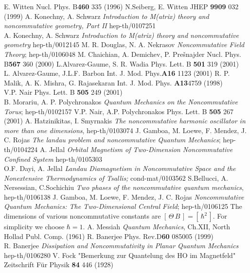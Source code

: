 \documentclass[a4paper,aps,prd,preprint]{revtex4}
\begin{document}
   
\begin{thebibliography}{99}
  E. Witten
Nucl. Phys. B\textbf{460} 335  (1996) 
 N.Seiberg,  E. Witten
JHEP \textbf{9909}  032 (1999)
 A. Konechny, A. Schwarz
 {\it  Introduction to M(atrix) theory and noncommutative geometry, Part II}
  hep-th/0107251\\
 A. Konechny, A. Schwarz
 {\it  Introduction to M(atrix) theory and noncommutative geometry}
  hep-th/0012145
M. R. Douglas, N. A. Nekrasov
 {\it Noncommutative Field Theory};  hep-th/0106048
 M. Chaichian, A. Demichev, P. Pre\v snajder
Nucl. Phys. B\textbf{567 } 360   (2000)
L.Alvarez-Gaume, S. R. Wadia
 Phys. Lett. B \textbf{501} 319 (2001)\\
 L. Alvarez-Gaume, J.L.F. Barbon 
 Int. J. Mod. Phys.\textbf{A16} 1123  (2001) 
  R. P. Malik, A. K. Mishra, G. Rajasekaran
   Int. J. Mod. Phys. \textbf{A13}4759 (1998)\\
  V.P. Nair 
  Phys. Lett. B \textbf{505} 249 (2001) \\
   B. Morariu, A. P. Polychronakos
  {\it Quantum Mechanics on the Noncommutative Torus}; hep-th/0102157
  V.P. Nair, A.P. Polychronakos 
Phys. Lett. B \textbf{505}  267 (2001)
  A. Hatzinikitas, I. Smyrnakis {\it  The noncommutative
 harmonic
oscillator in more than one dimensions}, hep-th/0103074
 J. Gamboa, M. Loewe, F. Mendez, J. C. Rojas
 {\it The landau problem and noncommutative Quantum Mechanics};
 hep-th/0104224
 A. Jellal
{\it Orbital Magnetism of Two-Dimension Noncommutative Confined System}
hep-th/0105303\\
O.F. Dayi, A. Jellal
 {\it Landau Diamagnetism in Noncommutative Space and the Nonextensive 
 Thermodynamics of Tsallis;} cond-mat/0103562 
   S.Bellucci, A. Nersessian, C.Sochichiu 
{\it Two phases of the noncommutative quantum mechanics}, hep-th/0106138
J. Gamboa, M. Loewe, F. Mendez, J. C. Rojas
 {\it Noncommutative Quantum Mechanics: The Two-Dimensional Central Field};
 hep-th/0106125 
 The dimensions  of various noncommutative constants 
are $\left[\, \Theta\, B\,\right]=\left[\,\hbar^2\,\right]$. For simplicity
we choose $\hbar=1$.
 A. Messiah {\it Quantum Mechanics}, Ch.XII, North Hollad
Publ. Comp. (1961)
 R. Banerjee
Phys. Rev.D\textbf{60}   085005  (1999)\\
R. Banerjee
{\it Dissipation and Noncommutativity in Planar Quantum Mechanics}
hep-th/0106280
 V. Fock
"Bemerkung zur Quantelung des HO im Magnetfeld"
Zeitschrift F\"ur Physik  \textbf{84} 446 (1928)
\end{thebibliography}
\end{document}
